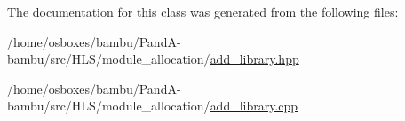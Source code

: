 The documentation for this class was generated from the following files\+:\begin{DoxyCompactItemize}
\item 
/home/osboxes/bambu/\+Pand\+A-\/bambu/src/\+H\+L\+S/module\+\_\+allocation/\hyperlink{add__library_8hpp}{add\+\_\+library.\+hpp}\item 
/home/osboxes/bambu/\+Pand\+A-\/bambu/src/\+H\+L\+S/module\+\_\+allocation/\hyperlink{add__library_8cpp}{add\+\_\+library.\+cpp}\end{DoxyCompactItemize}
